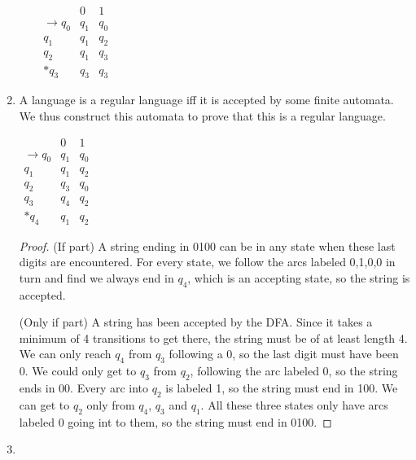 \documentclass{article}
\begin{document}
\begin{enumerate}
\begin{enumerate}
                $ \begin{array}{r|c|c}
                            & 0 & 1 \\ \hline \hline
                    \to q_0 & q_1 & q_0 \\
                    q_1 & q_1 & q_2 \\
                    q_2 & q_1 & q_3 \\
                    *q_3 & q_3 & q_3
                \end{array}
                $

        \end{enumerate}

    \item
        A language is a regular language iff it is accepted by some finite automata. We thus construct this automata to prove that this is a regular language.

        $ \begin{array}{r|c|c}
            & 0 & 1 \\ \hline \hline
            \to q_0 & q_1 & q_0 \\
            q_1 & q_1 & q_2 \\
            q_2 & q_3 & q_0 \\
            q_3 & q_4 & q_2 \\
            *q_4 & q_1 & q_2
        \end{array}
        $

        \begin{proof}
            (If part) A string ending in 0100 can be in any state when these last digits are encountered. For every state, we follow the arcs labeled 0,1,0,0 in turn and find we always end in $q_4$, which is an accepting state, so the string is accepted.

            (Only if part) A string has been accepted by the DFA. Since it takes a minimum of 4 transitions to get there, the string must be of at least length 4. We can only reach $q_4$ from $q_3$ following a 0, so the last digit must have been 0. We could only get to $q_3$ from $q_2$, following the arc labeled 0, so the string ends in 00. Every arc into $q_2$ is labeled 1, so the string must end in 100. We can get to $q_2$ only from $q_4$, $q_3$ and $q_1$. All these three states only have arcs labeled 0 going int to them, so the string must end in 0100.
        \end{proof}


    \item


\end{enumerate}
\end{document}
